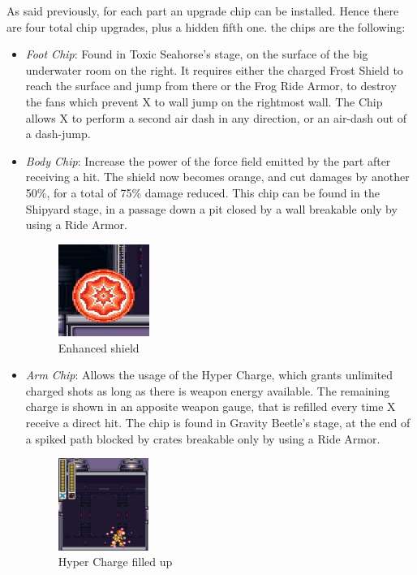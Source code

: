 As said previously, for each part an upgrade chip can be installed. Hence there are four total chip upgrades, plus a hidden fifth one. the chips are the following:
\begin{itemize}
	\item \emph{Foot Chip}: Found in Toxic Seahorse's stage, on the surface of the big underwater room on the right. It requires either the charged Frost Shield to reach the surface and jump from there or the Frog Ride Armor, to destroy the fans which prevent X to wall jump on the rightmost wall. The Chip allows X to perform a second air dash in any direction, or an air-dash out of a dash-jump.

	\item \emph{Body Chip}: Increase the power of the force field emitted by the part after receiving a hit. The shield now becomes orange, and cut damages by another 50\%, for a total of 75\% damage reduced. This chip can be found in the Shipyard stage, in a passage down a pit closed by a wall breakable only by using a Ride Armor.
	\begin{figure}[htp]
		\centering
		\includegraphics[height=3cm]{figures/X3/weapons/orange_shield.png}
		\caption{Enhanced shield}	
	\end{figure}


	\item \emph{Arm Chip}: Allows the usage of the Hyper Charge, which grants unlimited charged shots as long as there is weapon energy available. The remaining charge is shown in an apposite weapon gauge, that is refilled every time X receive a direct hit. The chip is found in Gravity Beetle's stage, at the end of a spiked path blocked by crates breakable only by using a Ride Armor.
	\begin{figure}[htp]
		\centering
		\includegraphics[height=3cm]{figures/X3/weapons/Hyper_shot.png}
		\caption{Hyper Charge filled up}	
	\end{figure}
	

\end{itemize}
